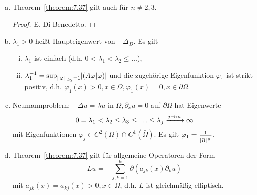 \begin{bem}
\label{bem:7.38}
\begin{enumerate}[(a)]
\item Theorem~\ref{theorem:7.37} gilt auch für $n \neq 2,3$.
\begin{proof}
E. Di Benedetto.
\end{proof}
\item $\lambda_1 > 0$ heißt Haupteigenwert von $-\Delta_D$. Es gilt
\begin{enumerate}[(i)]
\item $\lambda_1$ ist einfach (d.h. $0 < \lambda_1 < \lambda_2 \leq \ldots$),
\item $\lambda_1^{-1} = \sup_{\lVert \varphi\rVert_{L_2} = 1} \lvert (A\varphi\vert\varphi)\rvert$ und die zugehörige Eigenfunktion $\varphi_1$ ist strikt positiv, d.h. $\varphi_1 (x) > 0, x \in \Omega, \varphi_1(x) = 0, x \in \partial\Omega$.
\end{enumerate} 
\item Neumannproblem: $-\Delta u = \lambda u$ in $\Omega, \partial_\nu u = 0$ auf $\partial \Omega$ hat Eigenwerte 
\[
	0 = \lambda_1 < \lambda_2 \leq \lambda_3 \leq \ldots \leq \lambda_j \xrightarrow{j\rightarrow\infty} \infty
\]
mit Eigenfunktionen $\varphi_j \in C^2(\Omega) \cap C^1(\bar\Omega)$. Es gilt $\varphi_1 = \frac 1{\lvert \Omega\rvert^{\frac 1 2}}$.
\item Theorem~\ref{theorem:7.37} gilt für allgemeine Operatoren der Form
\[
	Lu = - \sum_{j,k=1}^n \partial (a_{jk}(x) \partial_k u)
\]
mit $a_{jk}(x) = a_{kj}(x) > 0, x \in \bar\Omega$, d.h. $L$ ist gleichmäßig elliptisch.
\end{enumerate}
\end{bem}


